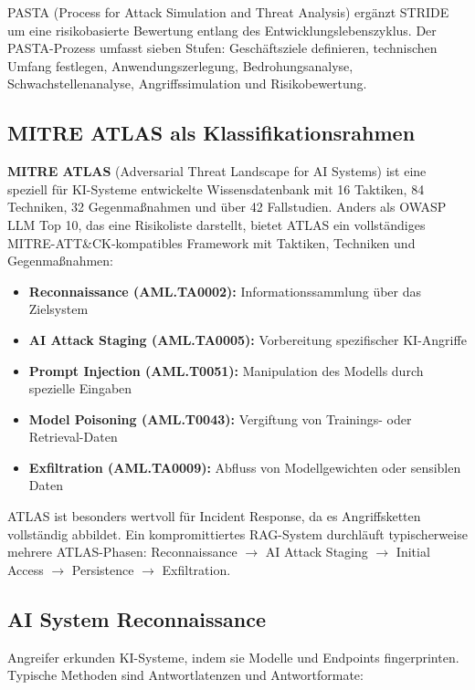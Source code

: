 PASTA (Process for Attack Simulation and Threat Analysis) ergänzt STRIDE um eine risikobasierte Bewertung entlang des Entwicklungslebenszyklus. Der PASTA-Prozess umfasst sieben Stufen: Geschäftsziele definieren, technischen Umfang festlegen, Anwendungszerlegung, Bedrohungsanalyse, Schwachstellenanalyse, Angriffssimulation und Risikobewertung.

\subsection{MITRE ATLAS als Klassifikationsrahmen}

\textbf{MITRE ATLAS} (Adversarial Threat Landscape for AI Systems) ist eine speziell für KI-Systeme entwickelte Wissensdatenbank mit 16 Taktiken, 84 Techniken, 32 Gegenmaßnahmen und über 42 Fallstudien. Anders als OWASP LLM Top 10, das eine Risikoliste darstellt, bietet ATLAS ein vollständiges MITRE-ATT\&CK-kompatibles Framework mit Taktiken, Techniken und Gegenmaßnahmen:

\begin{itemize}[leftmargin=*]
    \item \textbf{Reconnaissance (AML.TA0002):} Informationssammlung über das Zielsystem
    \item \textbf{AI Attack Staging (AML.TA0005):} Vorbereitung spezifischer KI-Angriffe
    \item \textbf{Prompt Injection (AML.T0051):} Manipulation des Modells durch spezielle Eingaben
    \item \textbf{Model Poisoning (AML.T0043):} Vergiftung von Trainings- oder Retrieval-Daten
    \item \textbf{Exfiltration (AML.TA0009):} Abfluss von Modellgewichten oder sensiblen Daten
\end{itemize}

ATLAS ist besonders wertvoll für Incident Response, da es Angriffsketten vollständig abbildet. Ein kompromittiertes RAG-System durchläuft typischerweise mehrere ATLAS-Phasen: Reconnaissance $\rightarrow$ AI Attack Staging $\rightarrow$ Initial Access $\rightarrow$ Persistence $\rightarrow$ Exfiltration.

\subsection{AI System Reconnaissance}

Angreifer erkunden KI-Systeme, indem sie Modelle und Endpoints fingerprinten. Typische Methoden sind Antwortlatenzen und Antwortformate:

